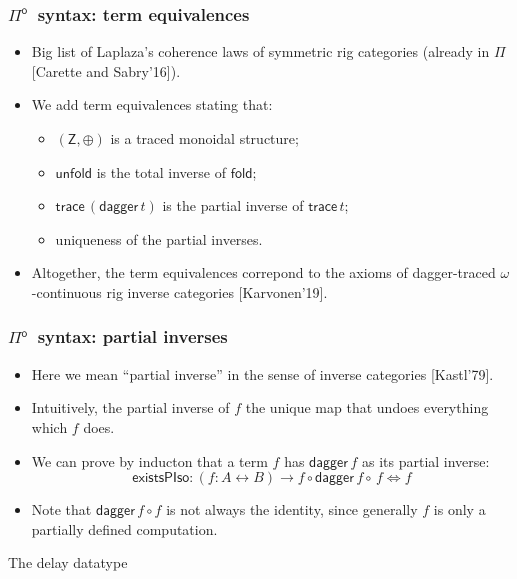 \documentclass[12pt,t]{beamer}
\newcommand{\Pio}{\ensuremath{\mathsf{\Pi}^{\mathsf{o}}}}
\newcommand{\lr}{\longleftrightarrow}
\newcommand{\fold}{\mathsf{fold}}
\newcommand{\unfold}{\mathsf{unfold}}
\newcommand{\trace}{\ensuremath{\mathsf{trace}}}
\newcommand{\Z}{\mathsf{Z}}
\newcommand{\LR}{\iff}
\renewcommand{\dagger}{\mathsf{dagger}}
\begin{document}
\begin{frame}
  \frametitle{\Pio\ syntax: term equivalences}
  \begin{itemize}    
  \item Big list of Laplaza's coherence laws of symmetric rig
    categories (already in $\Pi$ [Carette and Sabry'16]).
  \item We add term equivalences stating that:
    \begin{itemize}
    \item $(\Z,\oplus)$ is a traced monoidal structure;
    \item $\unfold$ is the total inverse of $\fold$;
    \item $\trace\,(\dagger \,t)$ is the partial inverse of $\trace\,t$;
    \item uniqueness of the partial inverses.
    \end{itemize}

    \vspace{\fill}
  \item Altogether, the term equivalences correpond to the axioms of
    dagger-traced $\omega$-continuous rig inverse categories [Karvonen'19].
    \end{itemize}
\end{frame}

\begin{frame}
  \frametitle{\Pio\ syntax: partial inverses}
  \begin{itemize}
  \item Here we mean ``partial inverse'' in the sense of inverse
    categories [Kastl'79].
  \item Intuitively, the partial inverse of $f$ the unique map that
    undoes everything which $f$ does.
  \item We can prove by inducton that a term $f$ has $\dagger\,f$ as
    its partial inverse:
    \[
    \mathsf{existsPIso} : (f : A \lr B) \to f \circ \dagger\,f
    \circ\,f \LR f
    \]
    \vspace{\fill}
  \item Note that $\dagger \,f \circ f$ is not always the identity,
    since generally $f$ is only a partially defined computation.
  \end{itemize}
\end{frame}

\begin{frame}[c]
  \begin{center}
    \Huge The delay datatype
  \end{center}
\end{frame}
\end{document}

